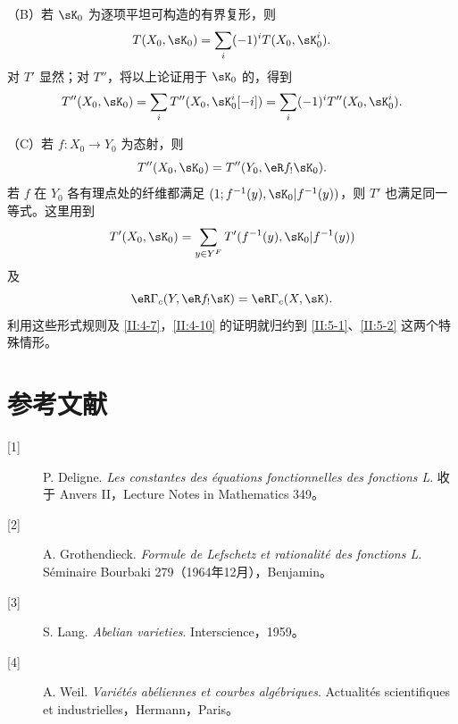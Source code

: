 \noindent（B）若 $\sK_0$ 为逐项平坦可构造的有界复形，则
\[T(X_0,\sK_0)=\sum_i(-1)^iT(X_0,\sK_0^i).\]
对 $T'$ 显然；对 $T''$，将以上论证用于 $\sK_0$ 的，得到
\[T''(X_0,\sK_0)=\sum_iT''(X_0,\sK_0^i[-i])=\sum_i(-1)^iT''(X_0,\sK_0^i).\]

\noindent（C）若 $f:X_0\to Y_0$ 为态射，则
\[T''(X_0,\sK_0)=T''(Y_0,\eR f_!\sK_0).\]
若 $f$ 在 $Y_0$ 各有理点处的纤维都满足 $(1;f^{-1}(y),\sK_0|f^{-1}(y))$，则 $T'$ 也满足同一等式。这里用到
\[T'(X_0,\sK_0)=\sum_{y\in Y^F}T'(f^{-1}(y),\sK_0|f^{-1}(y))\]
及
\[\eR\Gamma_c(Y,\eR f_!\sK)=\eR\Gamma_c(X,\sK).\]
利用这些形式规则及 \ref{II:4-7}，\ref{II:4-10} 的证明就归约到 \ref{II:5-1}、\ref{II:5-2} 这两个特殊情形。

\section*{参考文献}
\begin{description}
\item[{[1]}] P. Deligne. \emph{Les constantes des équations fonctionnelles des fonctions L}. 收于 Anvers II，Lecture Notes in Mathematics 349。
\item[{[2]}] A. Grothendieck. \emph{Formule de Lefschetz et rationalité des fonctions L}. Séminaire Bourbaki 279（1964年12月），Benjamin。
\item[{[3]}] S. Lang. \emph{Abelian varieties}. Interscience，1959。
\item[{[4]}] A. Weil. \emph{Variétés abéliennes et courbes algébriques}. Actualités scientifiques et industrielles，Hermann，Paris。
\end{description}
